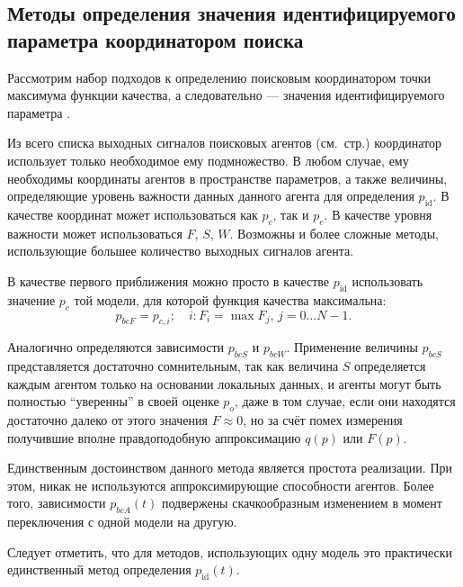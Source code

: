 \subsection{Методы определения значения идентифицируемого параметра координатором поиска} %


Рассмотрим набор подходов к определению поисковым координатором
точки максимума функции качества,
а следовательно --- значения идентифицируемого параметра \cite{atu_st99,atu_jacs2015,atu_st103}.

Из всего списка выходных сигналов поисковых агентов (см.~стр.\pageref{atu:d:agent_out_list})
координатор использует только необходимое ему подмножество.
В любом случае, ему необходимы координаты агентов в пространстве параметров, а также величины,
определяющие уровень важности данных данного агента для определения $p_\mathrm{id}$.
В качестве координат может использоваться как $p_c$, так и $p_e$.
В качестве уровня важности может использоваться $F$, $S$, $W$.
Возможны и более сложные методы, использующие большее
количество выходных сигналов агента.


В качестве первого приближения можно просто в качестве $p_\mathrm{id}$
использовать значение $p_c$ той модели, для которой функция качества максимальна:
%
\begin{equation}
  p_{bcF}
  =
  p_{c,i};
  \quad
  i : F_i = \max{F_j}, \, j=0 \ldots N-1 .
  \label{atu:eq:p_bcF}
\end{equation}

Аналогично определяются зависимости $p_{bcS}$ и $p_{bcW}$.
Применение величины $p_{bcS}$ представляется достаточно сомнительным,
так как величина $S$ определяется каждым агентом только на основании
локальных данных, и агенты могут быть полностью ``уверенны''
в своей оценке $p_o$, даже в том случае, если они находятся
достаточно далеко от этого значения $F \approx 0$,
но за счёт помех измерения получившие вполне правдоподобную аппроксимацию
$q(p)$ или $F(p)$.

Единственным достоинством данного метода является простота реализации.
При этом, никак не используются аппроксимирующие способности агентов.
Более того, зависимости $p_{bcA}(t)$ подвержены
скачкообразным изменением в момент переключения
с одной модели на другую.

Следует отметить, что для методов, использующих
одну модель это практически единственный метод определения $p_\mathrm{id}(t)$.

